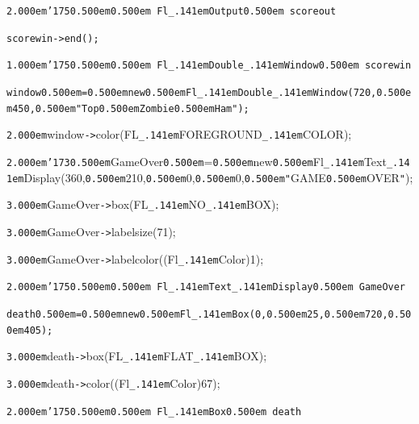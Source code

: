 \documentclass[12pt]{article}
\begin{document}
\noindent
{}{\tt\mc \kern2.000em}{\tt\char'175}{\tt\mc \kern0.500em}\tt\mc {\tt /}{\tt /}\kern0.500em Fl{\tt\_\kern.141em}Output{\tt *}\kern0.500em scoreout

\noindent
\tt\mc {\tt\mc \kern2.000em}scorewin{\tt -}{\tt >}end();

\noindent
{}{\tt\mc \kern1.000em}{\tt\char'175}{\tt\mc \kern0.500em}\tt\mc {\tt /}{\tt /}\kern0.500em Fl{\tt\_\kern.141em}Double{\tt\_\kern.141em}Window{\tt *}\kern0.500em scorewin

\noindent
\tt{}window{\tt\mc \kern0.500em}={\tt\mc \kern0.500em}new{\tt\mc \kern0.500em}Fl{\tt\_\kern.141em}Double{\tt\_\kern.141em}Window(720,{\tt\mc \kern0.500em}450,{\tt\mc \kern0.500em}{\tt "}Top{\tt\mc \kern0.500em}Zombie{\tt\mc \kern0.500em}Ham{\tt "});

\noindent
{}{\tt\mc \kern2.000em}window{\tt -}{\tt >}color(FL{\tt\_\kern.141em}FOREGROUND{\tt\_\kern.141em}COLOR);

\noindent
{}{\tt\mc \kern2.000em}{\tt\char'173}{\tt\mc \kern0.500em}GameOver{\tt\mc \kern0.500em}={\tt\mc \kern0.500em}new{\tt\mc \kern0.500em}Fl{\tt\_\kern.141em}Text{\tt\_\kern.141em}Display(360,{\tt\mc \kern0.500em}210,{\tt\mc \kern0.500em}0,{\tt\mc \kern0.500em}0,{\tt\mc \kern0.500em}{\tt "}GAME{\tt\mc \kern0.500em}OVER{\tt "});

\noindent
{}{\tt\mc \kern3.000em}GameOver{\tt -}{\tt >}box(FL{\tt\_\kern.141em}NO{\tt\_\kern.141em}BOX);

\noindent
{}{\tt\mc \kern3.000em}GameOver{\tt -}{\tt >}labelsize(71);

\noindent
{}{\tt\mc \kern3.000em}GameOver{\tt -}{\tt >}labelcolor((Fl{\tt\_\kern.141em}Color)1);

\noindent
{}{\tt\mc \kern2.000em}{\tt\char'175}{\tt\mc \kern0.500em}\tt\mc {\tt /}{\tt /}\kern0.500em Fl{\tt\_\kern.141em}Text{\tt\_\kern.141em}Display{\tt *}\kern0.500em GameOver

\noindent
\tt{}death{\tt\mc \kern0.500em}={\tt\mc \kern0.500em}new{\tt\mc \kern0.500em}Fl{\tt\_\kern.141em}Box(0,{\tt\mc \kern0.500em}25,{\tt\mc \kern0.500em}720,{\tt\mc \kern0.500em}405);

\noindent
{}{\tt\mc \kern3.000em}death{\tt -}{\tt >}box(FL{\tt\_\kern.141em}FLAT{\tt\_\kern.141em}BOX);

\noindent
{}{\tt\mc \kern3.000em}death{\tt -}{\tt >}color((Fl{\tt\_\kern.141em}Color)67);

\noindent
{}{\tt\mc \kern2.000em}{\tt\char'175}{\tt\mc \kern0.500em}\tt\mc {\tt /}{\tt /}\kern0.500em Fl{\tt\_\kern.141em}Box{\tt *}\kern0.500em death
\end{document}
